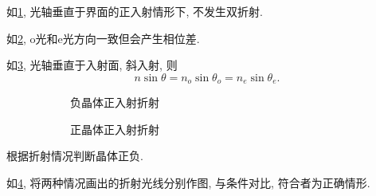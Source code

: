 \documentclass{ctexart}
\begin{document}
\begin{figure}[ht]
    \centering
    \caption{}
    \label{fig:光轴垂直于界面的正入射}
\end{figure}
\begin{sample}
    \begin{ex}
        如\cref{fig:光轴垂直于界面的正入射}, 光轴垂直于界面的正入射情形下, 不发生双折射.
    \end{ex}
\end{sample}
\begin{figure}[ht]
    \centering
    \caption{}
    \label{fig:光轴平行于界面的正入射}
\end{figure}
\begin{sample}
    \begin{ex}
        如\cref{fig:光轴平行于界面的正入射}, o光和e光方向一致但会产生相位差.
    \end{ex}
\end{sample}
\begin{figure}[ht]
    \centering
    \caption{}
    \label{fig:光轴垂直于入射面的斜入射}
\end{figure}
\begin{sample}
    \begin{ex}
        如\cref{fig:光轴垂直于入射面的斜入射}, 光轴垂直于入射面, 斜入射, 则
        \[ n\sin\theta = n_o\sin\theta_o = n_e\sin\theta_e. \]
    \end{ex}
\end{sample}
\begin{figure}[ht]
    \centering
    \begin{subfigure}{5cm}
        \centering
        \caption{负晶体正入射折射}
    \end{subfigure}
    \begin{subfigure}{5cm}
        \centering
        \caption{正晶体正入射折射}
    \end{subfigure}
    \caption{}
    \label{fig:正负晶体正入射折射}
\end{figure}
\begin{sample}
    \begin{ex}
        根据折射情况判断晶体正负.
    \end{ex}
    \begin{solution}
        如\cref{fig:正负晶体正入射折射}, 将两种情况画出的折射光线分别作图, 与条件对比, 符合者为正确情形.
    \end{solution}
\end{sample}
\end{document}
